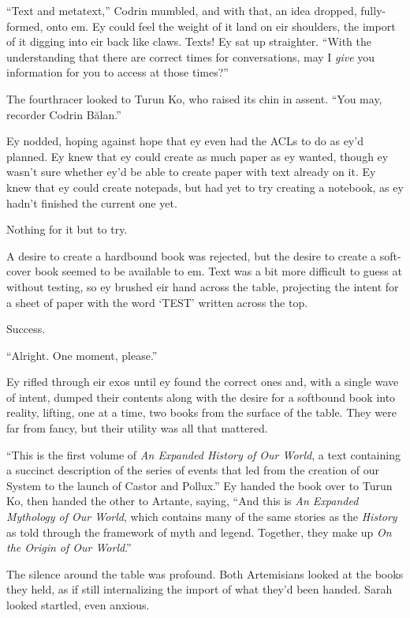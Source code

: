 ``Text and metatext,'' Codrin mumbled, and with that, an idea dropped, fully-formed, onto em. Ey could feel the weight of it land on eir shoulders, the import of it digging into eir back like claws. Texts! Ey sat up straighter. ``With the understanding that there are correct times for conversations, may I \emph{give} you information for you to access at those times?''

The fourthracer looked to Turun Ko, who raised its chin in assent. ``You may, recorder Codrin Bălan.''

Ey nodded, hoping against hope that ey even had the ACLs to do as ey'd planned. Ey knew that ey could create as much paper as ey wanted, though ey wasn't sure whether ey'd be able to create paper with text already on it. Ey knew that ey could create notepads, but had yet to try creating a notebook, as ey hadn't finished the current one yet.

Nothing for it but to try.

A desire to create a hardbound book was rejected, but the desire to create a soft-cover book seemed to be available to em. Text was a bit more difficult to guess at without testing, so ey brushed eir hand across the table, projecting the intent for a sheet of paper with the word `TEST' written across the top.

Success.

``Alright. One moment, please.''

Ey rifled through eir exos until ey found the correct ones and, with a single wave of intent, dumped their contents along with the desire for a softbound book into reality, lifting, one at a time, two books from the surface of the table. They were far from fancy, but their utility was all that mattered.

``This is the first volume of \emph{An Expanded History of Our World}, a text containing a succinct description of the series of events that led from the creation of our System to the launch of Castor and Pollux.'' Ey handed the book over to Turun Ko, then handed the other to Artante, saying, ``And this is \emph{An Expanded Mythology of Our World}, which contains many of the same stories as the \emph{History} as told through the framework of myth and legend. Together, they make up \emph{On the Origin of Our World}.''

The silence around the table was profound. Both Artemisians looked at the books they held, as if still internalizing the import of what they'd been handed. Sarah looked startled, even anxious.

